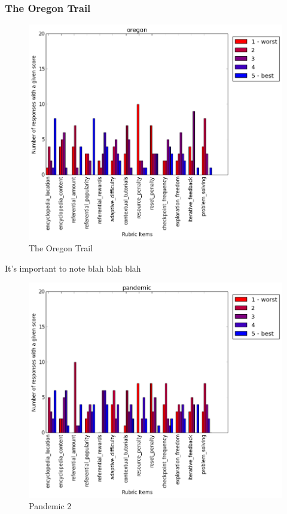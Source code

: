 			\subsubsection{The Oregon Trail}
				\begin{figure}[h] 
				\centering 
				\includegraphics[height=0.33\textheight]{oregon_scores.png} 
				\caption{The Oregon Trail}
				\end{figure}

				It's important to note blah blah blah

			\begin{figure}[h] 
			\centering 
			\includegraphics[height=0.33\textheight]{pandemic_scores.png} 
			\caption{Pandemic 2}
			\end{figure}

\cleardoublepage
